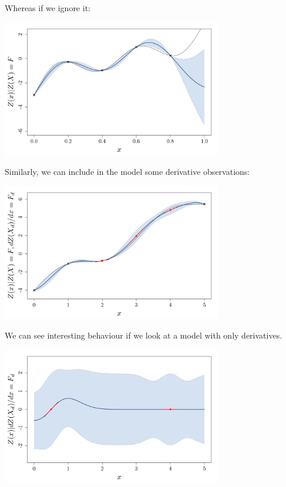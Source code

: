 \documentclass{beamer}
\begin{document}
\begin{frame}{}
\begin{example}
	Whereas if we ignore it:
	\begin{center}
	\includegraphics[height=6cm]{figures/R/exotic_pasint}
	\end{center}
\end{example}
\end{frame}

\begin{frame}{}
Similarly, we can include in the model some derivative observations:
	\begin{center}
	\includegraphics[height=6cm]{figures/R/exotic_der}
	\end{center}
\end{frame}

\begin{frame}{}
We can see interesting behaviour if we look at a model with only derivatives.
	\begin{center}
	\includegraphics[height=6cm]{figures/R/exotic_deronly}
	\end{center}
\end{frame}
\end{document}
